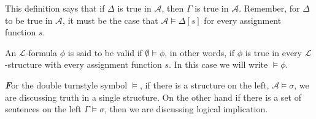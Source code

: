 \documentclass[10pt,a4paper]{article}
\newenvironment{callout}
	{\begin{calloutbox}\color{charcoal}\textbf\textit}
	{\end{calloutbox}}
\newcommand{\curveL}{\mathcal{L}}
\newcommand{\curveA}{\mathcal{A}}
\begin{document}
                    This definition says that if $\Delta$ is true in $\curveA$, then $\Gamma$ is true in $\curveA$. Remember, for $\Delta$ to be true in $\curveA$, it must be the case that $\curveA\vDash\Delta[s]$ for every assignment function $s$.
                    \begin{define}
                        An $\curveL$-formula $\phi$ is said to be valid if $\emptyset\vDash\phi$, in other words, if $\phi$ is true in every $\curveL$-structure with every assignment function $s$. In this case we will write $\vDash\phi$.
                    \end{define}
                    \begin{callout}
                        For the double turnstyle symbol $\vDash$, if there is a structure on the left, $\curveA\vDash \sigma$, we are discussing truth in a single structure. On the other hand if there is a set of sentences on the left $\Gamma\vDash\sigma$, then we are discussing logical implication.
                    \end{callout}
\end{document}
